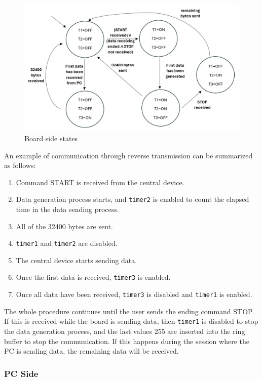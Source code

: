 \documentclass{Configuration_Files/PoliMi3i_thesis}
\begin{document}
\begin{figure}[H]
    \centering
    \includegraphics[scale=0.4]{Board Windows PC/Screenshot 2024-09-15 at 18.19.45.png}
    \caption{Board side states}
    \label{boardwindows_10}
\end{figure}

An example of communication through reverse transmission can be summarized as follows:

\begin{enumerate}
    \item Command START is received from the central device.
    \item Data generation process starts, and \texttt{timer2} is enabled to count the elapsed time in the data sending process.
    \item All of the 32400 bytes are sent.
    \item \texttt{timer1} and \texttt{timer2} are disabled.
    \item The central device starts sending data.
    \item Once the first data is received, \texttt{timer3} is enabled.
    \item Once all data have been received, \texttt{timer3} is disabled and \texttt{timer1} is enabled.
\end{enumerate}

The whole procedure continues until the user sends the ending command STOP. If this is received while the board is sending data, then \texttt{timer1} is disabled to stop the data generation process, and the last values 255 are inserted into the ring buffer to stop the communication. If this happens during the session where the PC is sending data, the remaining data will be received.

\subsubsection{PC Side}
\end{document}
